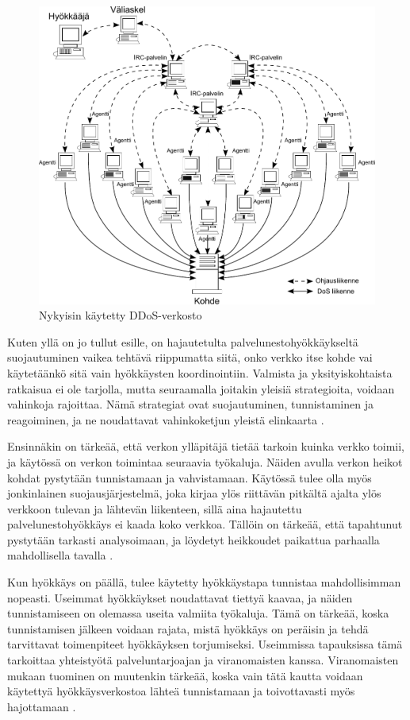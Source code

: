 \begin{figure}[t]
\centering
\includegraphics[width=12cm]{pics/ddos_uusi.pdf}
\caption{Nykyisin käytetty DDoS-verkosto}
\label{ddos2}
\end{figure}

Kuten yllä on jo tullut esille, on hajautetulta palvelunestohyökkäykseltä
suojautuminen vaikea tehtävä riippumatta siitä, onko verkko itse kohde vai
käytetäänkö sitä vain hyökkäysten koordinointiin. Valmista ja yksityiskohtaista
ratkaisua ei ole tarjolla, mutta seuraamalla joitakin yleisiä strategioita,
voidaan vahinkoja rajoittaa. Nämä strategiat ovat suojautuminen, tunnistaminen
ja reagoiminen, ja ne noudattavat vahinkoketjun yleistä elinkaarta \cite{DDOS}.

Ensinnäkin on tärkeää, että verkon ylläpitäjä tietää tarkoin kuinka verkko
toimii, ja käytössä on verkon toimintaa seuraavia työkaluja. Näiden avulla
verkon heikot kohdat pystytään tunnistamaan ja vahvistamaan. Käytössä tulee
olla myös jonkinlainen suojausjärjestelmä, joka kirjaa ylös riittävän pitkältä
ajalta ylös verkkoon tulevan ja lähtevän liikenteen, sillä aina hajautettu
palvelunestohyökkäys ei kaada koko verkkoa. Tällöin on tärkeää, että tapahtunut
pystytään tarkasti analysoimaan, ja löydetyt heikkoudet paikattua parhaalla
mahdollisella tavalla \cite{DDOS}.

Kun hyökkäys on päällä, tulee käytetty hyökkäystapa tunnistaa mahdollisimman
nopeasti. Useimmat hyökkäykset noudattavat tiettyä kaavaa, ja näiden
tunnistamiseen on olemassa useita valmiita työkaluja. Tämä on tärkeää, koska
tunnistamisen jälkeen voidaan rajata, mistä hyökkäys on peräisin ja tehdä
tarvittavat toimenpiteet hyökkäyksen torjumiseksi. Useimmissa tapauksissa
tämä tarkoittaa yhteistyötä palveluntarjoajan ja viranomaisten kanssa.
Viranomaisten mukaan tuominen on muutenkin tärkeää, koska vain tätä kautta
voidaan käytettyä hyökkäysverkostoa lähteä tunnistamaan ja toivottavasti myös
hajottamaan \cite{DDOS}.

